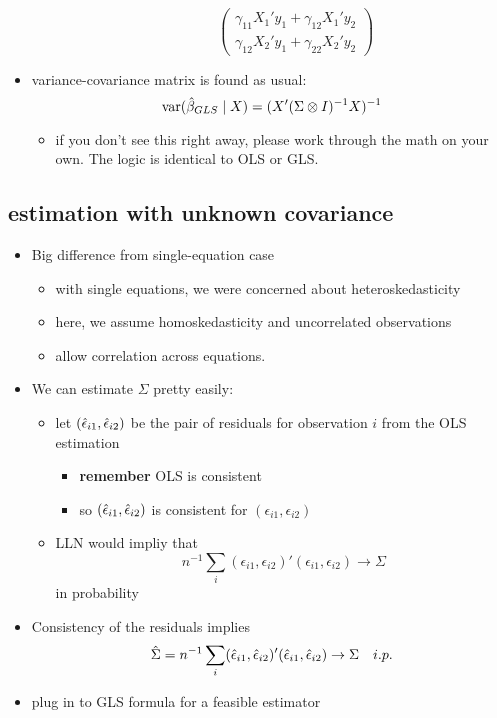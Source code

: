 \begin{itemize}[leftmargin=0pt]
\begin{itemize}
\begin{itemize}
\[\begin{pmatrix}
    \gamma_{11} X_1'y_1 + \gamma_{12} X_1'y_2 \\ \gamma_{12} X_2'y_1 + \gamma_{22} X_2'y_2
  \end{pmatrix} \]
\end{itemize}
\end{itemize}
\item variance-covariance matrix is found as usual:
  \[\operatorname{var}(\hat{\beta}_{GLS} \mid X) = (X'(\Sigma \otimes I)^{-1}X)^{-1}\]
\begin{itemize}
\item if you don't see this right away, please work through the
         math on your own.  The logic is identical to OLS or GLS.
\end{itemize}
\end{itemize}

\subsection{estimation with unknown covariance}

\begin{itemize}[leftmargin=0pt]
\item Big difference from single-equation case
\begin{itemize}
\item with single equations, we were concerned about heteroskedasticity
\item here, we assume homoskedasticity and uncorrelated observations
\item allow correlation across equations.
\end{itemize}
\item We can estimate $\Sigma$ pretty easily:
\begin{itemize}
\item let $(\hat{\epsilon}_{i1}, \hat{\epsilon}_{i2})$ be the pair of
         residuals for observation $i$ from the OLS estimation
\begin{itemize}
\item \textbf{remember} OLS is consistent
\item so $(\hat{\epsilon}_{i1}, \hat{\epsilon}_{i2})$ is consistent for $(\epsilon_{i1}, \epsilon_{i2})$
\end{itemize}
\item LLN would impliy that
  \[ n^{-1} \sum_i (\epsilon_{i1}, \epsilon_{i2})' (\epsilon_{i1}, \epsilon_{i2}) \to \Sigma\] in
  probability
\end{itemize}
\item Consistency of the residuals implies
  \[\hat{\Sigma} = n^{-1} \sum_i (\hat{\epsilon}_{i1}, \hat{\epsilon}_{i2})'(\hat{\epsilon}_{i1},\hat \epsilon_{i2})\to \Sigma
  \quad i.p.\]
\item plug in to GLS formula for a feasible estimator
\end{itemize}


